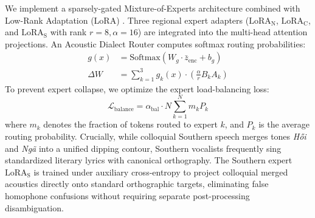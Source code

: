 We implement a sparsely-gated Mixture-of-Experts architecture \cite{shazeer2017outrageously,fedus2022switch} combined with Low-Rank Adaptation (LoRA) \cite{hu2021lora}. Three regional expert adapters ($\text{LoRA}_{\text{N}}$, $\text{LoRA}_{\text{C}}$, and $\text{LoRA}_{\text{S}}$ with rank $r=8, \alpha=16$) are integrated into the multi-head attention projections. An Acoustic Dialect Router computes softmax routing probabilities:
\begin{equation}
\begin{aligned}
g(x) &= \text{Softmax}(W_g \cdot \bar{z}_{\text{enc}} + b_g) \\
\Delta W &= \sum_{k=1}^3 g_k(x) \cdot \left(\frac{\alpha}{r} B_k A_k\right)
\end{aligned}
\end{equation}
To prevent expert collapse, we optimize the expert load-balancing loss:
\begin{equation}
\mathcal{L}_{\text{balance}} = \alpha_{\text{bal}} \cdot N \sum_{k=1}^N m_k P_k
\end{equation}
where $m_k$ denotes the fraction of tokens routed to expert $k$, and $P_k$ is the average routing probability. Crucially, while colloquial Southern speech merges tones \textit{H\H{o}i} and \textit{Ng\~a} into a unified dipping contour, Southern vocalists frequently sing standardized literary lyrics with canonical orthography. The Southern expert $\text{LoRA}_{\text{S}}$ is trained under auxiliary cross-entropy to project colloquial merged acoustics directly onto standard orthographic targets, eliminating false homophone confusions without requiring separate post-processing disambiguation.

